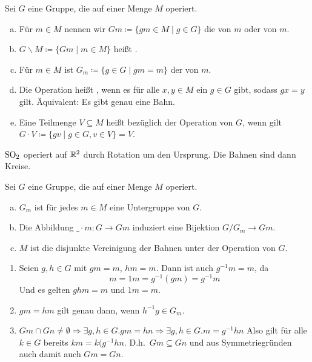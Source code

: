 \begin{definition}
  Sei \(G\) eine Gruppe, die auf einer Menge \(M\) operiert. 
  \begin{enumerate}[(a)]
  \item Für \(m\in M\) nennen wir \(Gm\coloneq\{gm\in M\mid g\in G\}\) die  von \(m\) oder  von \(m\).
  \item \(G\backslash M\coloneq \{Gm\mid m\in M\}\) heißt .
  \item Für \(m\in M\) ist \(G_m\coloneq \{g\in G\mid gm=m\}\) der  von \(m\).
  \item Die Operation heißt , wenn es für alle \(x,y\in M\) ein \(g\in G\) gibt, sodass \(gx=y\) gilt. Äquivalent: Es gibt genau eine Bahn.
  \item Eine Teilmenge \(V\subseteq M\) heißt  bezüglich der Operation von \(G\), wenn gilt \(G\cdot V\coloneq \{gv\mid g\in G, v\in V\}=V\).
  \end{enumerate}
\end{definition}

\begin{beispiel}
  \(\mathrm{SO}_2\) operiert auf \(\mathbb{R}^2\) durch Rotation um den Ursprung.
  Die Bahnen sind dann Kreise.
\end{beispiel}

\begin{lemma}
  Sei \(G\) eine Gruppe, die auf einer Menge \(M\) operiert. 
  \begin{enumerate}[(a)]
  \item \(G_m\) ist für jedes \(m\in M\) eine Untergruppe von \(G\).
  \item Die Abbildung \(\_\cdot m:G\to Gm\) induziert eine Bijektion \(G/G_m\to Gm\).
  \item \(M\) ist die disjunkte Vereinigung der Bahnen unter der Operation von \(G\).
  \end{enumerate}
\end{lemma}

\begin{beweis}
  \begin{enumerate}
  \item Seien \(g,h\in G\) mit \(gm=m\), \(hm=m\). Dann ist auch \(g^{-1}m=m\), da
    \[
    m=1m=g^{-1}(gm)=g^{-1}m
    \]
    Und es gelten \(ghm=m\) und \(1m=m\).
  \item \(gm=hm\) gilt genau dann, wenn \(h^{-1}g\in G_m\).
  \item \(Gm\cap Gn\neq\emptyset
    \Rightarrow \exists g,h\in G. gm=hn
    \Rightarrow \exists g,h\in G. m=g^{-1}hn\)
    Also gilt für alle \(k\in G\) bereits \(km=k(g^{-1}hn\).
    D.h.\ \(Gm\subseteq Gn\) und aus Symmetriegründen auch damit auch \(Gm=Gn\).
  \end{enumerate}
\end{beweis}

